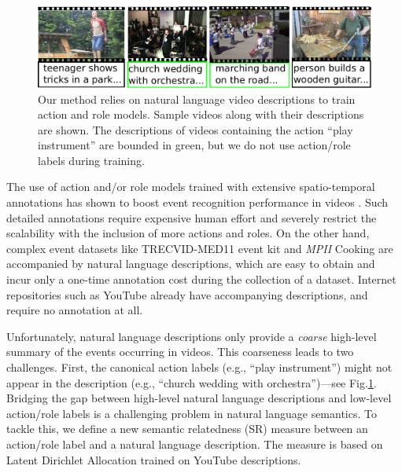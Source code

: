 \documentclass[10pt,twocolumn,letterpaper]{article}
\begin{document}
\begin{figure}[ht!]
\centering
   \includegraphics[scale = 0.4]{../images/pullFigure_2.pdf}
      \caption{Our method relies on natural language video descriptions to
      train action and role models. Sample videos along with their
      descriptions are shown.
      The descriptions of videos containing the action
      ``play instrument'' are bounded in green,
      but we do not use action/role labels during training.}
\label{fig:pull_figure}
\end{figure}

The use of action and/or role models trained with extensive spatio-temporal
annotations has shown to boost event recognition performance in videos
\cite{Izadinia_ECCV12, Lan_CVPR12}. Such detailed annotations require expensive
human effort and severely restrict the scalability with the inclusion of more
actions and roles.
On the other hand, complex event datasets like TRECVID-MED11 \cite{MED11} event kit and \textit{MPII} Cooking
\cite{Regneri_TACL13} are accompanied by natural language descriptions,
which are easy to obtain and incur only a one-time annotation cost during the
collection of a dataset.
Internet repositories such as YouTube already have accompanying descriptions,
and require no annotation at all.

Unfortunately,
natural language descriptions only provide a \emph{coarse} high-level summary of the events
occurring in videos.
This coarseness leads to two challenges.
First, the canonical action labels (e.g., ``play instrument'')
might not appear in the description (e.g., ``church wedding with orchestra'')---see
Fig.\ref{fig:pull_figure}.
Bridging the gap between high-level natural language descriptions and low-level action/role labels
is a challenging problem in natural language semantics.
To tackle this, we define a new semantic
relatedness (SR) measure between an action/role label and a natural language description.
The measure is based on Latent Dirichlet Allocation \cite{???} trained on
YouTube descriptions.
\end{document}
